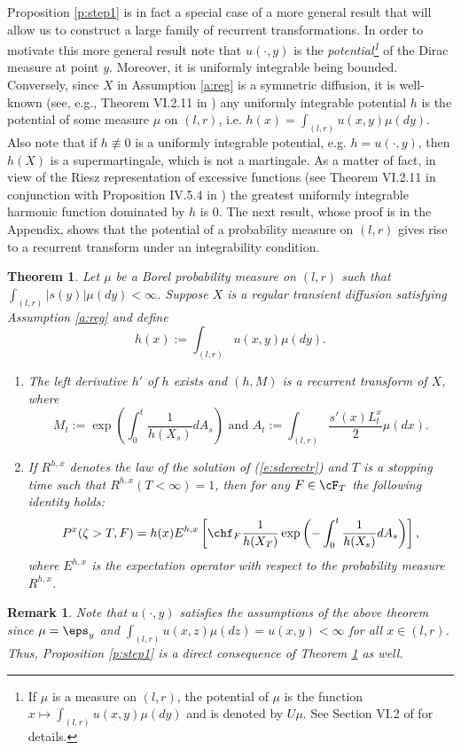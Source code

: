\documentclass[11pt,reqno]{amsart}
\numberwithin{equation}{section}
\newtheorem{theorem}{Theorem}[section]
\newtheorem{remark}{Remark}[section]
\begin{document}
Proposition \ref{p:step1} is in fact a special case of a more general result that will allow us to construct a large family of recurrent transformations. In order to motivate this more general result note that $u(\cdot,y)$ is the {\em potential\footnote{If $\mu$ is a measure on $(l,r)$, the potential of $\mu$ is the function $x \mapsto \int_{(l,r)} u(x,y)\mu(dy)$ and is denoted by $U\mu$. See Section VI.2 of \cite{BG} for details.}} of the Dirac measure at point $y$. Moreover, it is uniformly integrable being bounded.  Conversely, since $X$ in Assumption \ref{a:reg} is a symmetric diffusion, it is well-known (see, e.g., Theorem VI.2.11 in  \cite{BG}) any uniformly integrable potential $h$ is the potential of some measure $\mu$ on $(l,r)$, i.e. $h(x)=\int_{(l,r)} u(x,y)\mu(dy)$. Also note that if $h\not\equiv 0$ is a uniformly integrable potential, e.g. $h=u(\cdot,y)$, then $h(X)$ is a supermartingale, which is not a martingale. As a matter of fact, in view of the Riesz representation of excessive functions (see Theorem VI.2.11 in conjunction  with Proposition IV.5.4 in \cite{BG}) the greatest uniformly integrable harmonic function dominated by $h$ is $0$. The next result, whose proof is in the Appendix, shows that the potential of a probability measure on $(l,r)$ gives rise to a recurrent transform under an integrability condition. 
\begin{theorem} \label{t:rtrpot} Let $\mu$ be a Borel probability measure on $(l,r)$  such that $\int_{(l,r)}|s(y)|\mu(dy)<\infty$. Suppose $X$ is a regular  transient diffusion satisfying Assumption \ref{a:reg} and define 
	\[
	h(x):=\int_{(l,r)} u(x,y)\mu(dy).
	\]
\begin{enumerate}
	\item The left derivative $h'$ of $h$ exists and $(h,M)$ is a recurrent transform of $X$, where
	\[
	M_t :=\exp\left(\int_0^t\frac{1}{h(X_s)}dA_s\right) \mbox{ and } A_t:= \int_{(l,r)} \frac{s'(x)L^x_t}{2}\mu(dx).
	\]
	\item If $R^{h,x}$ denotes the law of the solution of (\ref{e:sderectr}) and $T$ is a stopping time such that $R^{h,x}(T<\infty)=1$, then for any $ F \in \cF_T$ the following identity holds:
	\[
	P^x(\zeta>T, F)= h(x)E^{h,x}\left[\chf_F \frac{1}{h(X_T)}\exp\left(-\int_0^t\frac{1}{h(X_s)}dA_s\right)\right],
	\]
	where $E^{h,x}$ is the expectation operator with respect to the probability measure $R^{h,x}$.
\end{enumerate}
\end{theorem}
\begin{remark}
	Note that $u(\cdot,y)$ satisfies the assumptions of the above theorem since $\mu=\eps_y$ and $\int_{(l,r)} u(x,z)\mu(dz)=u(x,y)<\infty$ for all $x\in (l,r)$. Thus, Proposition \ref{p:step1} is a direct consequence of Theorem \ref{t:rtrpot} as well.
\end{remark}
\end{document}
